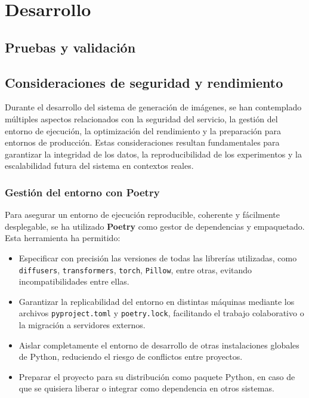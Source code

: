 \section{Desarrollo}


\subsection{Pruebas y validación}

\subsection{Consideraciones de seguridad y rendimiento}

Durante el desarrollo del sistema de generación de imágenes, se han contemplado múltiples aspectos relacionados con la seguridad del servicio, la gestión del entorno de ejecución, la optimización del rendimiento y la preparación para entornos de producción. Estas consideraciones resultan fundamentales para garantizar la integridad de los datos, la reproducibilidad de los experimentos y la escalabilidad futura del sistema en contextos reales.

\subsubsection{Gestión del entorno con Poetry}

Para asegurar un entorno de ejecución reproducible, coherente y fácilmente desplegable, se ha utilizado \textbf{Poetry} como gestor de dependencias y empaquetado. Esta herramienta ha permitido:

\begin{itemize}
    \item Especificar con precisión las versiones de todas las librerías utilizadas, como \texttt{diffusers}, \texttt{transformers}, \texttt{torch}, \texttt{Pillow}, entre otras, evitando incompatibilidades entre ellas.
    \item Garantizar la replicabilidad del entorno en distintas máquinas mediante los archivos \texttt{pyproject.toml} y \texttt{poetry.lock}, facilitando el trabajo colaborativo o la migración a servidores externos.
    \item Aislar completamente el entorno de desarrollo de otras instalaciones globales de Python, reduciendo el riesgo de conflictos entre proyectos.
    \item Preparar el proyecto para su distribución como paquete Python, en caso de que se quisiera liberar o integrar como dependencia en otros sistemas.
\end{itemize}


